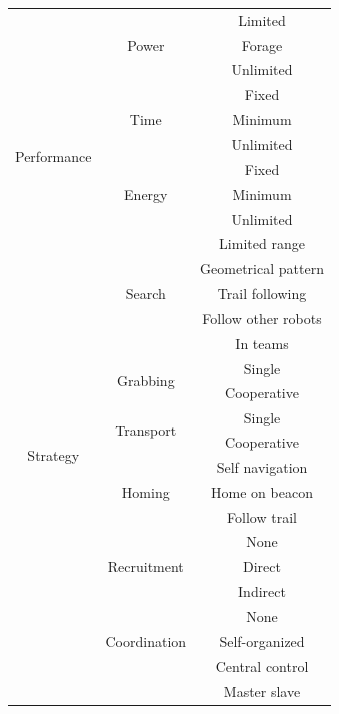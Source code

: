 \begin{longtable}{ | c | c | c |}
		& \multirow{3}{*}{Power} 
			& Limited \\\nopagebreak
		&	& Forage \\\nopagebreak 
		&	& Unlimited \\\hline
	\multirow{6}{*}{Performance}
		& \multirow{3}{*}{Time} 
			& Fixed \\  \nopagebreak
		& 	& Minimum \\ \nopagebreak
		& 	& Unlimited \\ \cline{2-3}
		& \multirow{3}{*}{Energy} 
			& Fixed \\ \nopagebreak
		& 	& Minimum \\ \nopagebreak
		&	& Unlimited \\ \hline
	\multirow{18}{*}{Strategy}	
		& \multirow{5}{*}{Search}
			& Limited range \\ \nopagebreak
		&	& Geometrical pattern\\ \nopagebreak
		&	& Trail following\\ \nopagebreak
		&	& Follow other robots\\ \nopagebreak
		&	& In teams\\ \cline{2-3} \nopagebreak
		& \multirow{2}{*}{Grabbing} 
			& Single \\ \nopagebreak
		&	& Cooperative \\ \cline{2-3} \nopagebreak
		& \multirow{2}{*}{Transport}
			& Single \\ \nopagebreak
		&	& Cooperative \\ \cline{2-3} \nopagebreak
		& \multirow{3}{*}{Homing} 
			& Self navigation \\ \nopagebreak
		&	& Home on beacon \\ \nopagebreak
		&	& Follow trail \\\cline{2-3} \nopagebreak
		& \multirow{3}{*}{Recruitment} 
			& None \\ \nopagebreak
		&	& Direct \\ \nopagebreak
		&	& Indirect \\\cline{2-3} \nopagebreak
		& \multirow{3}{*}{Coordination} 
			& None \\ \nopagebreak
		&	& Self-organized \\ \nopagebreak
		&	&  Central control \\ \nopagebreak
		&	& Master slave \\ \hline
\end{longtable}


